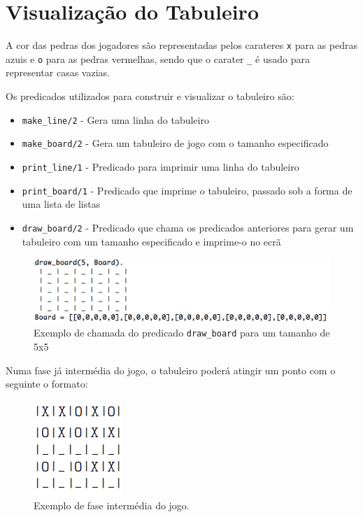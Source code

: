 \documentclass[a4paper]{article}
\begin{document}
\newpage

\section{Visualização do Tabuleiro}

A cor das pedras dos jogadores são representadas pelos carateres \texttt{x} para as pedras azuis e \texttt{o} para as pedras vermelhas, sendo que o carater \texttt{\_} é usado para representar casas vazias.

Os predicados utilizados para construir e visualizar o tabuleiro são:

\begin{itemize}
	\item \texttt{make\_line/2} - Gera uma linha do tabuleiro
	\item \texttt{make\_board/2} - Gera um tabuleiro de jogo com o tamanho especificado
	\item \texttt{print\_line/1} - Predicado para imprimir uma linha do tabuleiro
	\item \texttt{print\_board/1} - Predicado que imprime o tabuleiro, passado sob a forma de uma lista de listas
	\item \texttt{draw\_board/2} - Predicado que chama os predicados anteriores para gerar um tabuleiro com um tamanho especificado e imprime-o no ecrã
\end{itemize}

\begin{figure}[!htb]
	\centering
	\includegraphics[scale=0.6]{images/draw_board.png}
	\caption{Exemplo de chamada do predicado \texttt{draw\_board} para um tamanho de 5x5}
\end{figure}

Numa fase já intermédia do jogo, o tabuleiro poderá atingir um ponto com o seguinte o formato:

\begin{figure}[!htb]
	\centering
	\includegraphics[scale=0.5]{images/board_prolog.png}
	\caption{Exemplo de fase intermédia do jogo.}
\end{figure}
\end{document}
